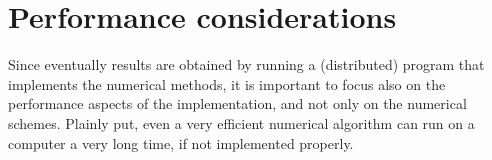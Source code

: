 \section{Performance considerations}
Since eventually results are obtained by running a (distributed) program that implements the numerical methods, it is important to focus also on the performance aspects of the implementation, and not only on the numerical schemes. Plainly put, even a very efficient numerical algorithm can run on a computer a very long time, if not implemented properly.




